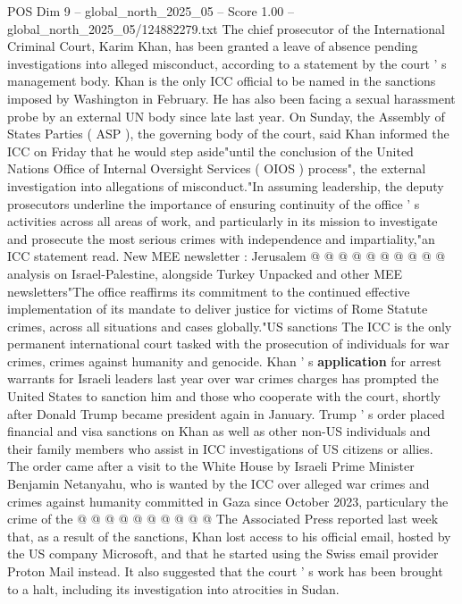 \begin{textsample}{POS Dim 9 – global\_north\_2025\_05 – Score 1.00 – global\_north\_2025\_05/124882279.txt}  \label{ex:f9_pos_274}
The chief prosecutor of the International Criminal Court, Karim Khan, has been granted a leave of absence pending investigations into alleged misconduct, according to a statement by the court ' s management body.
Khan is the only ICC official to be named in the sanctions imposed by Washington in February.
He has also been facing a sexual harassment probe by an external UN body since late last year.
On Sunday, the Assembly of States Parties ( ASP ), the governing body of the court, said Khan informed the ICC on Friday that he would step aside"until the conclusion of the United Nations Office of Internal Oversight Services ( OIOS ) process", the external investigation into allegations of misconduct."In assuming leadership, the deputy prosecutors underline the importance of ensuring continuity of the office ' s activities across all areas of work, and particularly in its mission to investigate and prosecute the most serious crimes with independence and impartiality,"an ICC statement read.
New MEE newsletter : Jerusalem @ @ @ @ @ @ @ @ @ @ analysis on Israel-Palestine, alongside Turkey Unpacked and other MEE newsletters"The office reaffirms its commitment to the continued effective implementation of its mandate to deliver justice for victims of Rome Statute crimes, across all situations and cases globally."US sanctions The ICC is the only permanent international court tasked with the prosecution of individuals for war crimes, crimes against humanity and genocide.
Khan ' s \textbf{application} for arrest warrants for Israeli leaders last year over war crimes charges has prompted the United States to sanction him and those who cooperate with the court, shortly after Donald Trump became president again in January.
Trump ' s order placed financial and visa sanctions on Khan as well as other non-US individuals and their family members who assist in ICC investigations of US citizens or allies.
The order came after a visit to the White House by Israeli Prime Minister Benjamin Netanyahu, who is wanted by the ICC over alleged war crimes and crimes against humanity committed in Gaza since October 2023, particulary the crime of the @ @ @ @ @ @ @ @ @ @ The Associated Press reported last week that, as a result of the sanctions, Khan lost access to his official email, hosted by the US company Microsoft, and that he started using the Swiss email provider Proton Mail instead.
It also suggested that the court ' s work has been brought to a halt, including its investigation into atrocities in Sudan.

\end{textsample}
